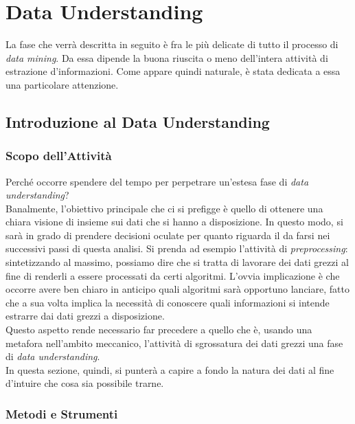 \chapter{Data Understanding}

La fase che verrà descritta in seguito è fra le più delicate di tutto il processo di \textit{data mining}. Da essa dipende la buona riuscita o meno dell'intera attività di estrazione d'informazioni. Come appare quindi naturale, è stata dedicata a essa una particolare attenzione.

\section{Introduzione al Data Understanding}

\subsection{Scopo dell'Attività}

Perché occorre spendere del tempo per perpetrare un'estesa fase di \textit{data understanding}? \\

Banalmente, l'obiettivo principale che ci si prefigge è quello di ottenere una chiara visione di insieme sui dati che si hanno a disposizione. In questo modo, si sarà in grado di prendere decisioni oculate per quanto riguarda il da farsi nei successivi passi di questa analisi. Si prenda ad esempio l'attività di \textit{preprocessing}: sintetizzando al massimo, possiamo dire che si tratta di lavorare dei dati grezzi al fine di renderli a essere processati da certi algoritmi. L'ovvia implicazione è che occorre avere ben chiaro in anticipo quali algoritmi sarà opportuno lanciare, fatto che a sua volta implica la necessità di conoscere quali informazioni si intende estrarre dai dati grezzi a disposizione. \\

Questo aspetto rende necessario far precedere a quello che è, usando una metafora nell'ambito meccanico, l'attività di sgrossatura dei dati grezzi una fase di \textit{data understanding}. \\

In questa sezione, quindi, si punterà a capire a fondo la natura dei dati al fine d'intuire che cosa sia possibile trarne.

\subsection{Metodi e Strumenti}

